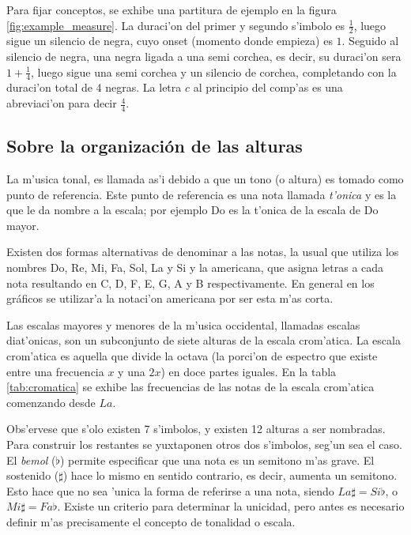 Para fijar conceptos, se exhibe una partitura de ejemplo en la figura \ref{fig:example_measure}. 
La duraci'on del primer y segundo s'imbolo es $\frac{1}{2}$,
luego sigue un silencio de negra, cuyo onset (momento donde empieza) es $1$. Seguido al silencio de negra, una negra ligada a una semi corchea, 
es decir, su duraci'on sera $1 + \frac{1}{4}$, 
luego sigue una semi corchea y un silencio de corchea, completando
con la duraci'on total de 4 negras. La letra $c$ al principio del comp'as es una abreviaci'on para decir $\frac{4}{4}$.

\begin{imagen}
    \width{12.5cm}
\end{imagen}

\subsection{Sobre la organizaci\'on de las alturas}
La m'usica tonal, es llamada as'i debido a que un tono (o altura) es tomado como punto de referencia.
Este punto de referencia es una nota llamada \emph{t'onica} y es la que le da nombre a la escala; por ejemplo Do es la t'onica de la escala de Do mayor. 

Existen dos formas alternativas de denominar a las notas, la usual que utiliza los nombres Do, Re, Mi, Fa, Sol, La y Si y la americana, que asigna
letras a cada nota resultando en C, D, F, E, G, A y B respectivamente. En general en los gr\'aficos se utilizar'a la notaci'on americana 
por ser esta m'as corta.

Las escalas mayores y menores de la m'usica occidental, llamadas escalas diat'onicas, son un subconjunto de siete alturas de la escala crom'atica.
La escala crom'atica es aquella que divide la octava (la porci'on de espectro que existe entre una frecuencia $x$ y una $2x$)
en doce partes iguales.
En la tabla \ref{tab:cromatica} se exhibe las frecuencias de las notas de la escala crom'atica comenzando desde $La$. 

Obs'ervese que s'olo existen 7 s'imbolos, y existen 12 alturas a ser nombradas. Para construir los restantes se yuxtaponen otros dos s'imbolos, 
seg'un sea el caso. 
El \emph{bemol} ($\flat$) permite especificar que una nota es un semitono m'as grave. El sostenido ($\sharp$) hace lo mismo en sentido contrario, 
es decir, aumenta un semitono.
Esto hace que no sea 'unica la forma de referirse a una nota, siendo $La\sharp = Si\flat$, o $Mi\sharp=Fa\flat$. Existe un criterio para determinar la 
unicidad, pero antes es necesario definir m'as precisamente el concepto de tonalidad o escala.


